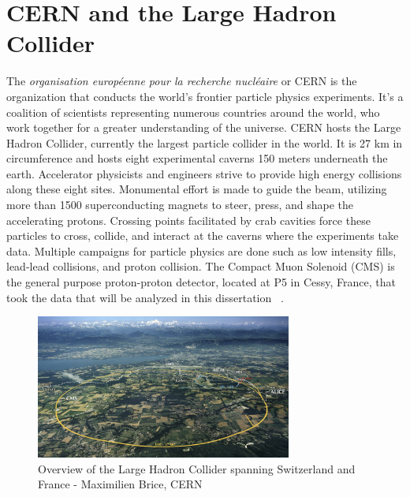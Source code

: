 \section{CERN and the Large Hadron Collider}
The \textit{organisation européenne pour la recherche nucléaire} or CERN is the organization that conducts the world's frontier particle physics experiments. It's a coalition of scientists representing numerous countries around the world, who work together for a greater understanding of the universe. CERN hosts the Large Hadron Collider, currently the largest particle collider in the world. It is 27 km in circumference and hosts eight experimental caverns 150 meters underneath the earth. Accelerator physicists and engineers strive to provide high energy collisions along these eight sites. Monumental effort is made to guide the beam, utilizing more than 1500 superconducting magnets to steer, press, and shape the accelerating protons. Crossing points facilitated by crab cavities force these particles to cross, collide, and interact at the caverns where the experiments take data. Multiple campaigns for particle physics are done such as low intensity fills, lead-lead collisions, and proton collision. The Compact Muon Solenoid (CMS) is the general purpose proton-proton detector, located at P5 in Cessy, France, that took the data that will be analyzed in this dissertation ~\cite{Bruning:782076}. 

\begin{figure}[ht!b]
  \centering
\includegraphics[width=0.75\textwidth]{figures/LHC_map-s.jpg}    
    \caption{\label{fig:lhc} Overview of the Large Hadron Collider spanning Switzerland and France - Maximilien Brice, CERN }
\end{figure}

